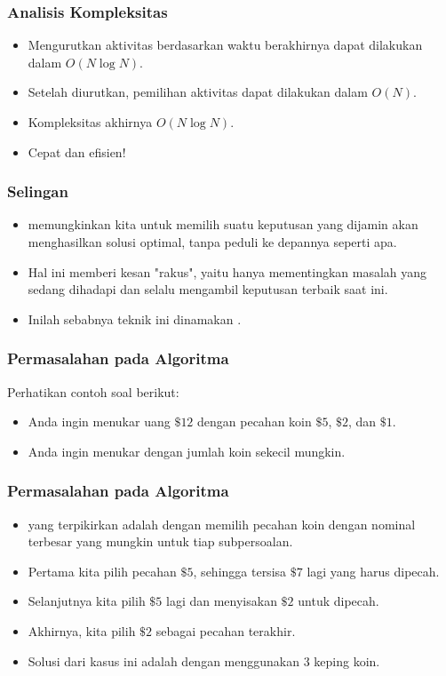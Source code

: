 \begin{frame}
  \frametitle{Analisis Kompleksitas}
  \begin{itemize}
    \item Mengurutkan aktivitas berdasarkan waktu berakhirnya dapat dilakukan dalam $O(N \log{N})$.
    \item Setelah diurutkan, pemilihan aktivitas dapat dilakukan dalam $O(N)$.
    \item Kompleksitas akhirnya $O(N \log{N})$.
    \item Cepat dan efisien!
  \end{itemize}
\end{frame}

\begin{frame}
  \frametitle{Selingan}
  \begin{itemize}
    \item \fGreedyChoice memungkinkan kita untuk memilih suatu keputusan yang dijamin akan menghasilkan solusi optimal, tanpa peduli ke depannya seperti apa.
    \item Hal ini memberi kesan "rakus", yaitu hanya mementingkan masalah yang sedang dihadapi dan selalu mengambil keputusan terbaik saat ini.
    \item Inilah sebabnya teknik ini dinamakan \fgreedy.
  \end{itemize}
\end{frame}

\begin{frame}
  \frametitle{Permasalahan pada Algoritma \fGreedy}
  Perhatikan contoh soal berikut:
  \begin{itemize}
    \item Anda ingin menukar uang $\$12$ dengan pecahan koin $\$5$, $\$2$, dan $\$1$.
    \item Anda ingin menukar dengan jumlah koin sekecil mungkin.
  \end{itemize}
\end{frame}

\begin{frame}
  \frametitle{Permasalahan pada Algoritma \fGreedy}
  \begin{itemize}
    \item \fGreedyChoice yang terpikirkan adalah dengan memilih pecahan koin dengan nominal terbesar yang mungkin untuk tiap subpersoalan.
    \item Pertama kita pilih pecahan $\$5$, sehingga tersisa $\$7$ lagi yang harus dipecah.
    \item Selanjutnya kita pilih $\$5$ lagi dan menyisakan $\$2$ untuk dipecah.
    \item Akhirnya, kita pilih $\$2$ sebagai pecahan terakhir.
    \item Solusi dari kasus ini adalah dengan menggunakan 3 keping koin.
  \end{itemize}
\end{frame}

